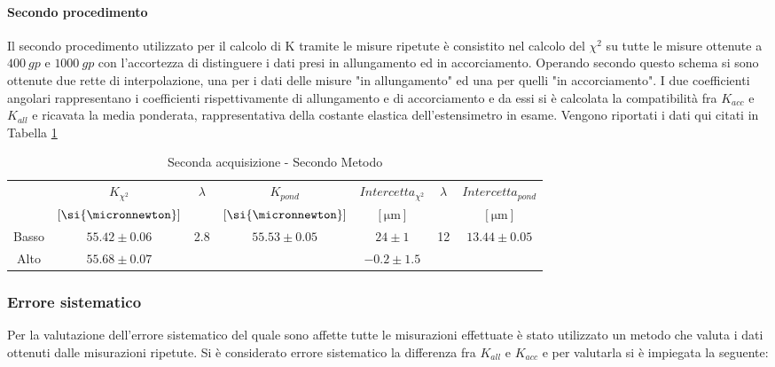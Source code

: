 \documentclass[a4paper,11pt,oneside]{article}
\begin{document}
\paragraph{Secondo procedimento}
Il secondo procedimento utilizzato per il calcolo di K tramite le misure ripetute è consistito nel calcolo del $\chi^2$ su tutte le misure ottenute a $\SI{400}{gp}$ e $\SI{1000}{gp}$ con l'accortezza di distinguere i dati presi in allungamento ed in accorciamento. Operando secondo questo schema si sono ottenute due rette di interpolazione, una per i dati delle misure "in allungamento" ed una per quelli "in accorciamento". I due coefficienti angolari rappresentano i coefficienti rispettivamente di allungamento e di accorciamento e da essi si è calcolata la compatibilità fra ${K}_{acc}$ e ${K}_{all}$ e ricavata la media ponderata, rappresentativa della costante elastica dell'estensimetro in esame. Vengono riportati i dati qui citati in Tabella \ref{tab:2ac_2met}%

\begin{table}[h!]
\centering
\caption{Seconda acquisizione - Secondo Metodo}
\label{tab:2ac_2met}
\begin{tabular}{|c|c|c|c|c|c|c|}
    \hline
    & $K_{\chi^2}$ & \multirow{2}{*}{$\lambda$} & $K_{pond}$ & $Intercetta_{\chi^2}$ & \multirow{2}{*}{$\lambda$} & $Intercetta_{pond}$\\
    &$[\si{\micronnewton}]$&&$[\si{\micronnewton}]$& $[\si{\micro\meter}]$ & & $[\si{\micro\meter}]$\\ \hline
    {\cellcolor[rgb]{0.85,0.85,0.85}}Basso & {\cellcolor[rgb]{0.85,0.85,0.85}}$55.42\pm0.06$  & \multirow{2}{*}{2.8}  & \multirow{2}{*}{$55.53\pm0.05$} & {\cellcolor[rgb]{0.85,0.85,0.85}}$24\pm1$   &   \multirow{2}{*}{12} & \multirow{2}{*}{$13.44\pm0.05$}   \\ \cline{1-2} \cline{5-5}
    Alto  & $55.68\pm0.07$ & & & $-0.2\pm1.5$ & & \\ \hline
\end{tabular}
\end{table}
\newpage

\subsubsection*{Errore sistematico}\label{par:errore_desalva}
Per la valutazione dell'errore sistematico del quale sono affette tutte le misurazioni effettuate è stato utilizzato un metodo che valuta i dati ottenuti dalle misurazioni ripetute. Si è considerato errore sistematico la differenza fra $K_{all}$ e $K_{acc}$ e per valutarla si è impiegata la seguente:
\end{document}
